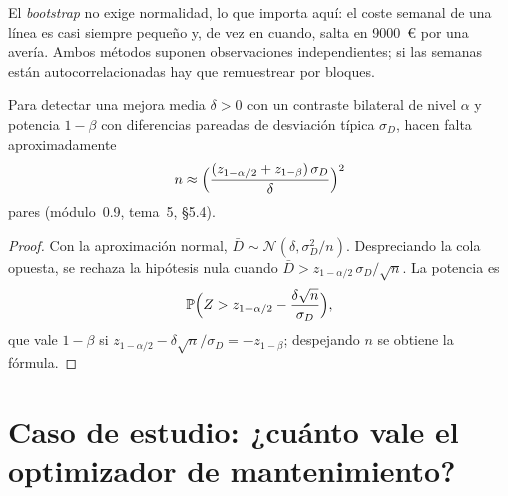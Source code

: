 El \emph{bootstrap} no exige normalidad, lo que importa aquí: el coste semanal de una línea es casi siempre pequeño y, de vez en cuando, salta en 9000~€ por una avería. Ambos métodos suponen observaciones independientes; si las semanas están autocorrelacionadas hay que remuestrear por bloques.

\begin{proposicion}\label{prop:tamano}
Para detectar una mejora media $\delta>0$ con un contraste bilateral de nivel $\alpha$ y potencia $1-\beta$ con diferencias pareadas de desviación típica $\sigma_D$, hacen falta aproximadamente
\[
n\approx\Bigl(\frac{(z_{1-\alpha/2}+z_{1-\beta})\,\sigma_D}{\delta}\Bigr)^{2}
\]
pares (módulo~0.9, tema~5, §5.4).
\end{proposicion}

\begin{proof}
Con la aproximación normal, $\bar D\sim\mathcal{N}(\delta,\sigma_D^{2}/n)$. Despreciando la cola opuesta, se rechaza la hipótesis nula cuando $\bar D>z_{1-\alpha/2}\,\sigma_D/\sqrt n$. La potencia es
\[
\mathbb{P}\Bigl(Z>z_{1-\alpha/2}-\frac{\delta\sqrt n}{\sigma_D}\Bigr),
\]
que vale $1-\beta$ si $z_{1-\alpha/2}-\delta\sqrt n/\sigma_D=-z_{1-\beta}$; despejando $n$ se obtiene la fórmula.
\end{proof}

\section{Caso de estudio: ¿cuánto vale el optimizador de mantenimiento?}


